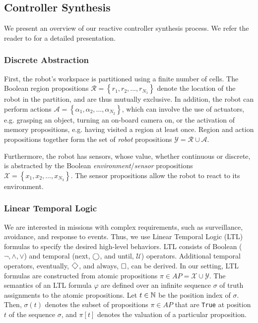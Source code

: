 \subsection{Controller Synthesis}\label{preliminariesA}

We present an overview of our reactive controller synthesis process. We refer the reader to \cite{KGFP_TRO09} for a detailed presentation.

\subsubsection*{Discrete Abstraction}

First, the robot's workspace is partitioned using a finite number of cells. The Boolean region propositions $\mathcal{R} = \left\{r_1, r_2, \ldots, r_{N_1} \right\}$ denote the location of the robot in the partition, and are thus mutually exclusive. In addition, the robot can perform actions $\mathcal{A} = \left\{\alpha_1, \alpha_2, \ldots, \alpha_{N_2} \right\}$, which can involve the use of actuators, e.g. grasping an object, turning an on-board camera on, or the activation of memory propositions, e.g. having visited a region at least once. Region and action propositions together form the set of \emph{robot} propositions $\mathcal{Y} = \mathcal{R} \cup \mathcal{A}$.

Furthermore, the robot has sensors, whose value, whether continuous or discrete, is abstracted by the Boolean \emph{environment}/\emph{sensor} propositions $\mathcal{X} = \left\{ x_1, x_2, \ldots, x_{N_3} \right\}$. 
The sensor propositions allow the robot to react to its environment. 

\subsubsection*{Linear Temporal Logic}

We are interested in missions with complex requirements, such as surveillance, avoidance, and response to events. 
Thus, we use Linear Temporal Logic (LTL) formulas to specify the desired high-level behaviors. LTL consists of Boolean ($\neg, \wedge, \lor$) and temporal (next, $\operatorname{\bigcirc}$, and until, $\mathcal{U}$) operators. 
Additional temporal operators, eventually, $\F$, and always, $\operatorname{\Box}$, can be derived. 
In our setting, LTL formulas are constructed from atomic propositions $\pi \in AP = \mathcal{X} \cup \mathcal{Y}$. 
The semantics of an LTL formula $\varphi$ are defined over an infinite sequence $\sigma$ of truth assignments to the atomic propositions. 
Let $t \in \mathbb{N}$ be the position index of $\sigma$. Then, $\sigma (t)$ denotes the subset of propositions $\pi \in AP$ that are \texttt{True} at position $t$ of the sequence $\sigma$, and $\pi [t]$ denotes the valuation of a particular proposition.

